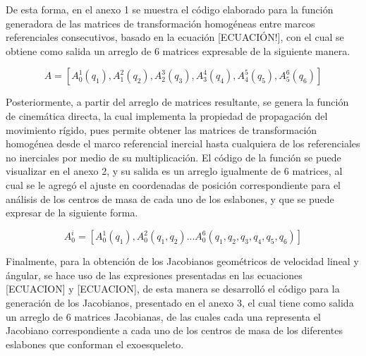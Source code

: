     De esta forma, en el anexo 1 se muestra el código elaborado para la función generadora de 
    las matrices de transformación homogéneas entre marcos referenciales consecutivos, basado 
    en la ecuación [ECUACIÓN!], con el cual se obtiene como salida un arreglo de 6 matrices 
    expresable de la siguiente manera.

    \begin{equation*}
        A = [A^1_0(q_1), A^2_1(q_2), A^3_2(q_3), A^4_3(q_4), A^5_4(q_5), A^6_5(q_6)]
    \end{equation*}

    Posteriormente, a partir del arreglo de matrices resultante, se genera la función 
    de cinemática directa, la cual implementa la propiedad de propagación del movimiento 
    rígido, pues permite obtener las matrices de transformación homogénea desde el marco 
    referencial inercial hasta cualquiera de los referenciales no inerciales por medio de su multiplicación. 
    El código de la función se puede visualizar en el anexo 2, y su salida es un arreglo igualmente de 
    6 matrices, al cual se le agregó el ajuste en coordenadas de posición correspondiente para 
    el análisis de los centros de masa de cada uno de los eslabones, y que se puede expresar 
    de la siguiente forma.

    \begin{equation*}
        A^i_0 = [A^1_0(q_1), A^2_0(q_1,q_2)...A^6_0(q_1,q_2,q_3,q_4,q_5,q_6)]
    \end{equation*}

    Finalmente, para la obtención de los Jacobianos geométricos de velocidad lineal y ángular, 
    se hace uso de las expresiones presentadas en las ecuaciones [ECUACION] y [ECUACION], de 
    esta manera se desarrolló el código para la generación de los Jacobianos, presentado en el 
    anexo 3, el cual tiene como salida un arreglo de 6 matrices Jacobianas, de las cuales cada una 
    representa el Jacobiano correspondiente a cada uno de los centros de masa de los diferentes eslabones 
    que conforman el exoesqueleto.


